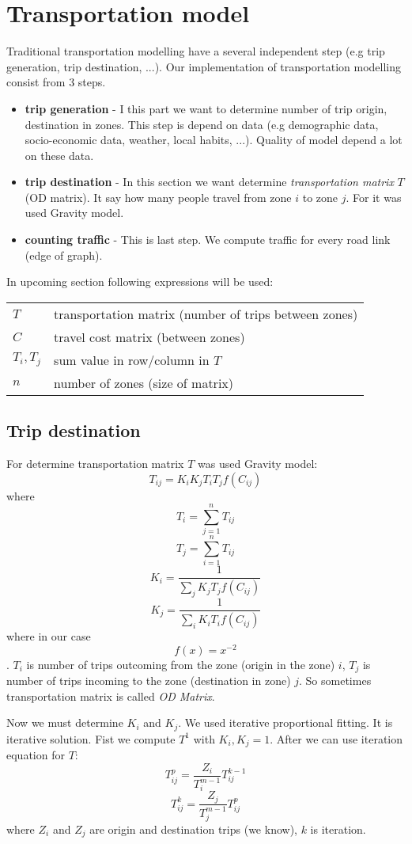 \section{Transportation model}
Traditional transportation modelling have a several independent step (e.g trip generation, trip destination, ...). Our implementation of transportation modelling consist from 3 steps.
\begin{itemize}
\item[ ] \textbf{trip generation} - I this part we want to determine number of trip origin, destination in zones. This step is depend on data (e.g demographic data, socio-economic data, weather, local habits, ...). Quality of model depend a lot on these data.
\item[ ] \textbf{trip destination} - In this section we want determine \textit{transportation matrix} $T$ (OD matrix). It say how many people travel from zone $i$ to zone $j$. For it was used Gravity model.
\item[ ] \textbf{counting traffic} - This is last step.  We compute traffic for every road link (edge of graph).
\end{itemize}
In upcoming section following expressions will be used:

\begin{tabular}{ll}
$T$ & transportation matrix (number of trips between zones)\\
$C$ & travel cost matrix (between zones) \\
$T_i, T_j$ & sum value in row/column in $T$\\
$n$ & number of zones (size of matrix)
\end{tabular}

\subsection{Trip destination}

For determine transportation matrix $T$ was used Gravity model:
$$T_{ij} = K_i K_j T_i T_j f(C_{ij})$$
where
$$T_i = \sum_{j = 1}^{n} T_{ij}$$
$$T_j = \sum_{i = 1}^{n} T_{ij}$$
$$K_i = \frac{1}{\sum_{j} K_j T_j f(C_{ij})}$$
$$K_j = \frac{1}{\sum_{i} K_i T_i f(C_{ij})}$$
where in our case $$f(x) = x^{-2}$$.
$T_i$ is number of trips outcoming from the zone (origin in the zone) $i$, $T_j$ is number of trips incoming to the zone (destination in zone) $j$. So sometimes transportation matrix is called \textit{OD Matrix}. 

Now we must determine $K_i$ and $K_j$. We used iterative proportional fitting. It is iterative solution. Fist we compute $T^1$ with $K_i, K_j = 1$. After we can use iteration equation for $T$:
$$T_{ij}^{p} = \frac{Z_i}{T_i^{m-1}} T_{ij}^{k-1}$$
$$T_{ij}^{k} = \frac{Z_j}{T_j^{m-1}} T_{ij}^{p}$$
where $Z_i$ and $Z_j$ are origin and destination trips (we know), $k$ is iteration.

